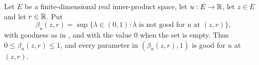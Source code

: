 \begin{definition}
Let $E$ be a finite-dimensional real inner-product space, let $u:E\to\mathbb{R}$, let
$z\in E$ and let $r\in\mathbb{R}$. Put
\[
  \beta_u(z,r)=\sup\{\lambda\in(0,1):\lambda\text{ is not good for }u
                        \text{ at }(z,r)\},
\]
with goodness as in , and with the value $0$ when the set
is empty. Thus $0\le\beta_u(z,r)\le1$, and every parameter in
$(\beta_u(z,r),1)$ is good for $u$ at $(z,r)$.
\end{definition}
